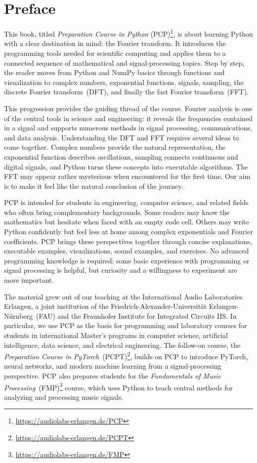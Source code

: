 \section*{Preface}

{\fontsize{8.5}{12}\selectfont

This book, titled \emph{Preparation Course in Python} (PCP)\footnote{\url{https://audiolabs-erlangen.de/PCP}}, is about learning Python with a clear destination in mind: the Fourier transform. It introduces the programming tools needed for scientific computing and applies them to a connected sequence of mathematical and signal-processing topics. Step by step, the reader moves from Python and NumPy basics through functions and visualization to complex numbers, exponential functions, signals, sampling, the discrete Fourier transform~(DFT), and finally the fast Fourier transform~(FFT).

This progression provides the guiding thread of the course. Fourier analysis is one of the central tools in science and engineering: it reveals the frequencies contained in a signal and supports numerous methods in signal processing, communications, and data analysis. Understanding the DFT and FFT requires several ideas to come together. Complex numbers provide the natural representation, the exponential function describes oscillations, sampling connects continuous and digital signals, and Python turns these concepts into executable algorithms. The FFT may appear rather mysterious when encountered for the first time. Our aim is to make it feel like the natural conclusion of the journey.

PCP is intended for students in engineering, computer science, and related fields who often bring complementary backgrounds. Some readers may know the mathematics but hesitate when faced with an empty code cell. Others may write Python confidently but feel less at home among complex exponentials and Fourier coefficients. PCP brings these perspectives together through concise explanations, executable examples, visualizations, sound examples, and exercises. No advanced programming knowledge is required; some basic experience with programming or signal processing is helpful, but curiosity and a willingness to experiment are more important.

The material grew out of our teaching at the International Audio Laboratories Erlangen, a joint institution of the Friedrich-Alexander-Universität Erlangen-Nürnberg~(FAU) and the Fraunhofer Institute for Integrated Circuits IIS. In particular, we use PCP as the basis for programming and laboratory courses for students in international Master's programs in computer science, artificial intelligence, data science, and electrical engineering. The follow-on course, the \emph{Preparation Course in PyTorch}~(PCPT)\footnote{\url{https://audiolabs-erlangen.de/PCPT}}, builds on PCP to introduce PyTorch, neural networks, and modern machine learning from a signal-processing perspective. PCP also prepares students for the \emph{Fundamentals of Music Processing}~(FMP)\footnote{\url{https://audiolabs-erlangen.de/FMP}} course, which uses Python to teach central methods for analyzing and processing music signals.

}
